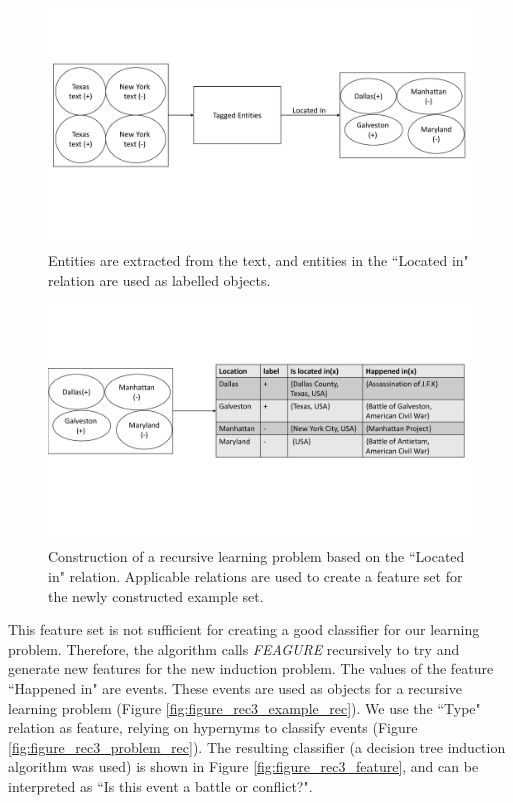 \documentclass[twoside,11pt]{article}
\theoremstyle{definition}
\begin{document}
\begin{figure}[!h]
	\centering
	\includegraphics[width=\linewidth]{figure_rec3_example_new}
	\caption{Entities are extracted from the text, and entities in the ``Located in" relation are used as labelled objects.}
	\label{fig:figure_rec3_example}
\end{figure}

\begin{figure}[!h]
	\centering
	\includegraphics[width=\linewidth]{figure_rec3_problem_new}
	\caption{Construction of a recursive learning problem based on the ``Located in" relation. Applicable relations are used to create a feature set for the newly constructed example set.}
	\label{fig:figure_rec3_problem}
\end{figure}

This feature set is not sufficient for creating a good classifier for our learning problem. Therefore, the algorithm calls \emph{FEAGURE} recursively to try and generate new features for the new induction problem.
The values of the feature ``Happened in" are events. These events are used as objects for a recursive learning problem (Figure \ref{fig:figure_rec3_example_rec}).
We use the ``Type" relation as feature, relying on hypernyms to classify events (Figure \ref{fig:figure_rec3_problem_rec}).
The resulting classifier (a decision tree induction algorithm was used) is shown in Figure \ref{fig:figure_rec3_feature}, and can be interpreted as ``Is this event a battle or conflict?".
\end{document}
